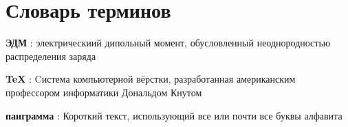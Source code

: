 \chapter*{Словарь терминов}             %

\textbf{ЭДМ} : электрическиий дипольный момент, обусловленный неоднородностью распределения заряда

\textbf{TeX} : Cистема компьютерной вёрстки, разработанная американским профессором информатики Дональдом Кнутом

\textbf{панграмма} : Короткий текст, использующий все или почти все буквы алфавита
